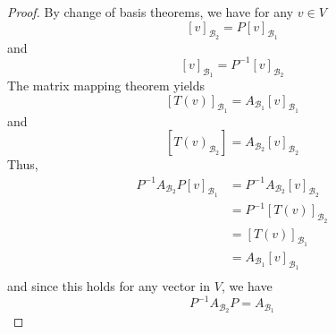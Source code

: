 \documentclass{article}
\begin{document}
\begin{proof}
  By change of basis theorems, we have for any $v \in V$ \[
    [v]_{\mathcal{B}_2} = P[v]_{\mathcal{B}_1}
  \] and \[
    [v]_{\mathcal{B}_1} = P^{-1}[v]_{\mathcal{B}_2}
  \]
  The matrix mapping theorem yields \[
    [T(v)]_{\mathcal{B}_1} = A_{\mathcal{B}_1}[v]_{\mathcal{B}_1}
  \] and \[
    [T(v)_{\mathcal{B}_2}] = A_{\mathcal{B}_2}[v]_{\mathcal{B}_2}
  \]
  Thus,
  \begin{align*}
    P^{-1}A_{\mathcal{B}_2}P[v]_{\mathcal{B}_1} &= P^{-1}A_{\mathcal{B}_2}[v]_{\mathcal{B}_2}\\
    &= P^{-1}[T(v)]_{\mathcal{B}_2}\\
    &= [T(v)]_{\mathcal{B}_1}\\
    &= A_{\mathcal{B}_1}[v]_{\mathcal{B}_1}\\
  \end{align*} and since this holds for any vector in $V$, we have \[
    P^{-1}A_{\mathcal{B}_2}P = A_{\mathcal{B}_1}
  \]
\end{proof}
\end{document}
